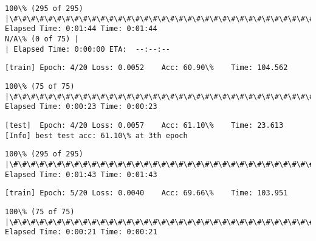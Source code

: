 \documentclass[11pt]{article}
\begin{document}
    \begin{Verbatim}[commandchars=\\\{\}]
100\% (295 of 295) |\#\#\#\#\#\#\#\#\#\#\#\#\#\#\#\#\#\#\#\#\#\#\#\#\#\#\#\#\#\#\#\#\#\#\#\#\#\#\#\#\#\#\#\#\#\#\#\#\#\#\#\#\#\#\#\#\#\#\#\#\#\#\#| Elapsed Time: 0:01:44 Time: 0:01:44
N/A\% (0 of 75) |                                                                 | Elapsed Time: 0:00:00 ETA:  --:--:--
    \end{Verbatim}

    \begin{Verbatim}[commandchars=\\\{\}]
[train]	Epoch: 4/20	Loss: 0.0052	Acc: 60.90\%	Time: 104.562

    \end{Verbatim}

    \begin{Verbatim}[commandchars=\\\{\}]
100\% (75 of 75) |\#\#\#\#\#\#\#\#\#\#\#\#\#\#\#\#\#\#\#\#\#\#\#\#\#\#\#\#\#\#\#\#\#\#\#\#\#\#\#\#\#\#\#\#\#\#\#\#\#\#\#\#\#\#\#\#\#\#\#\#\#\#\#\#\#| Elapsed Time: 0:00:23 Time: 0:00:23

    \end{Verbatim}

    \begin{Verbatim}[commandchars=\\\{\}]
[test]	Epoch: 4/20	Loss: 0.0057	Acc: 61.10\%	Time: 23.613
[Info] best test acc: 61.10\% at 3th epoch

    \end{Verbatim}

    \begin{Verbatim}[commandchars=\\\{\}]
100\% (295 of 295) |\#\#\#\#\#\#\#\#\#\#\#\#\#\#\#\#\#\#\#\#\#\#\#\#\#\#\#\#\#\#\#\#\#\#\#\#\#\#\#\#\#\#\#\#\#\#\#\#\#\#\#\#\#\#\#\#\#\#\#\#\#\#\#| Elapsed Time: 0:01:43 Time: 0:01:43

    \end{Verbatim}

    \begin{Verbatim}[commandchars=\\\{\}]
[train]	Epoch: 5/20	Loss: 0.0040	Acc: 69.66\%	Time: 103.951

    \end{Verbatim}

    \begin{Verbatim}[commandchars=\\\{\}]
100\% (75 of 75) |\#\#\#\#\#\#\#\#\#\#\#\#\#\#\#\#\#\#\#\#\#\#\#\#\#\#\#\#\#\#\#\#\#\#\#\#\#\#\#\#\#\#\#\#\#\#\#\#\#\#\#\#\#\#\#\#\#\#\#\#\#\#\#\#\#| Elapsed Time: 0:00:21 Time: 0:00:21

    \end{Verbatim}
\end{document}
